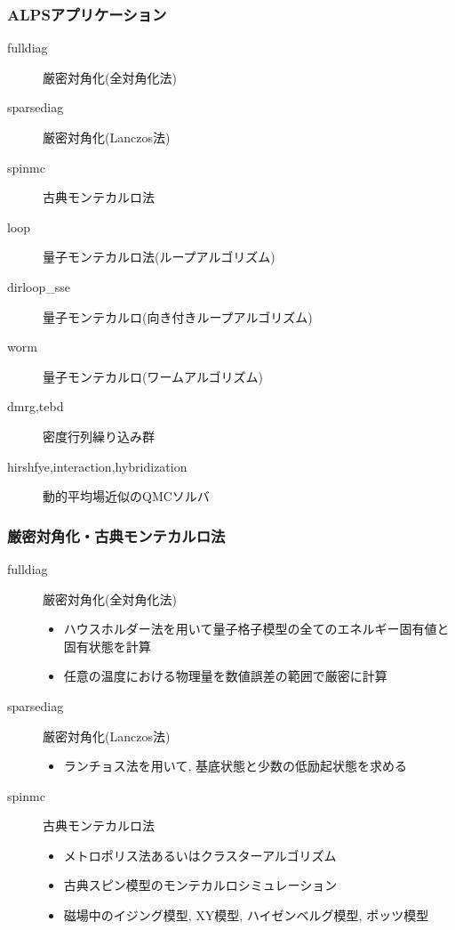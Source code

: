 \begin{frame}[t,fragile]
  \frametitle{ALPSアプリケーション}
  \begin{description}
  \item[fulldiag] 厳密対角化(全対角化法)
  \item[sparsediag] 厳密対角化(Lanczos法)
  \item[spinmc] 古典モンテカルロ法
  \item[loop] 量子モンテカルロ法(ループアルゴリズム)
  \item[dirloop\_sse] 量子モンテカルロ(向き付きループアルゴリズム)
  \item[worm] 量子モンテカルロ(ワームアルゴリズム)
  \item[dmrg,tebd] 密度行列繰り込み群
  \item[hirshfye,interaction,hybridization] 動的平均場近似のQMCソルバ
  \end{description}
\end{frame}

\begin{frame}[t,fragile]
  \frametitle{厳密対角化・古典モンテカルロ法}
  \begin{description}
  \item[fulldiag] 厳密対角化(全対角化法)
    \begin{itemize}
    \item ハウスホルダー法を用いて量子格子模型の全てのエネルギー固有値と固有状態を計算
    \item 任意の温度における物理量を数値誤差の範囲で厳密に計算
    \end{itemize}
  \item[sparsediag] 厳密対角化(Lanczos法)
    \begin{itemize}
    \item ランチョス法を用いて, 基底状態と少数の低励起状態を求める
    \end{itemize}
  \item[spinmc] 古典モンテカルロ法
    \begin{itemize}
      \item メトロポリス法あるいはクラスターアルゴリズム
      \item 古典スピン模型のモンテカルロシミュレーション
      \item 磁場中のイジング模型, XY模型, ハイゼンベルグ模型, ポッツ模型
    \end{itemize}
  \end{description}
\end{frame}

